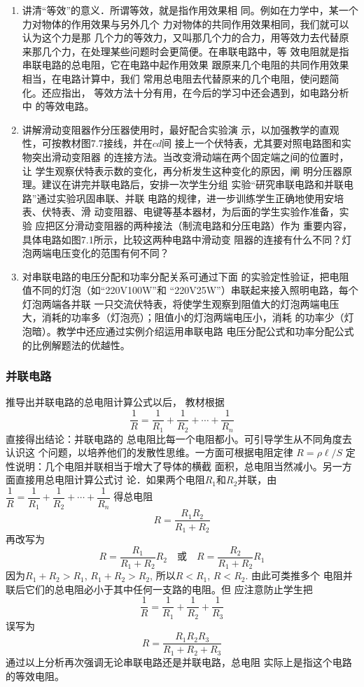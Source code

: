 \begin{enumerate}
    \item 讲清“等效”的意义．所谓等效，就是指作用效果相
同。例如在力学中，某一个力对物体的作用效果与另外几个
力对物体的共同作用效果相同，我们就可以认为这个力是那
几个力的等效力，又叫那几个力的合力，用等效力去代替原
来那几个力，在处理某些问题时会更简便。在串联电路中，等
效电阻就是指串联电路的总电阻，它在电路中起作用效果
跟原来几个电阻的共同作用效果相当，在电路计算中，我们
常用总电阻去代替原来的几个电阻，使问题简化。还应指出，
等效方法十分有用，在今后的学习中还会遇到，如电路分析中
的等效电路。
\item 讲解滑动变阻器作分压器使用时，最好配合实验演
示，以加强教学的直观性，可按教材图7.7接线，并在$cd$间
接上一个伏特表，尤其要对照电路图和实物突出滑动变阻器
的连接方法。当改变滑动端在两个固定端之间的位置时，让
学生观察伏特表示数的变化，再分析发生这种变化的原因，阐
明分压器原理。建议在讲完并联电路后，安排一次学生分组
实验“研究串联电路和并联电路”通过实验巩固串联、并联
电路的规律，进一步训练学生正确地使用安培表、伏特表、滑
动变阻器、电键等基本器材，为后面的学生实验作准备，实验
应把区分滑动变阻器的两种接法（制流电路和分压电路）作为
重要内容，具体电路如图7.1所示，比较这两种电路中滑动变
阻器的连接有什么不同？灯泡两端电压变化的范围有何不同？

\begin{figure}[htp]
    \centering
    \caption{}
\end{figure}
\item 对串联电路的电压分配和功率分配关系可通过下面
的实验定性验证，把电阻值不同的灯泡（如“220V100W”和
“220V25W”）串联起来接入照明电路，每个灯泡两端各并联
一只交流伏特表，将使学生观察到阻值大的灯泡两端电压
大，消耗的功率多（灯泡亮）；阻值小的灯泡两端电压小，消耗
的功率少（灯泡暗）。教学中还应通过实例介绍运用串联电路
电压分配公式和功率分配公式的比例解题法的优越性。
\end{enumerate}

\subsubsection{并联电路}

推导出并联电路的总电阻计算公式以后，
教材根据
\[\frac{1}{R}=\frac{1}{R_1}+\frac{1}{R_2}+\cdots+\frac{1}{R_n}\]
直接得出结论：并联电路的
总电阻比每一个电阻都小。可引导学生从不同角度去认识这
个问题，以培养他们的发散性思维。一方面可根据电阻定律
$R=\rho\ell/S$
定性说明：几个电阻并联相当于增大了导体的横截
面积，总电阻当然减小。另一方面直接用总电阻计算公式讨
论．如果两个电阻$R_1$和$R_2$并联，由
$\dfrac{1}{R}=\dfrac{1}{R_1}+\dfrac{1}{R_2}+\cdots+\dfrac{1}{R_n}$
得总电阻
\[R=\frac{R_1R_2}{R_1+R_2}\]
再改写为
\[R=\frac{R_1}{R_1+R_2}R_2\quad \text{或}\quad R=\frac{R_2}{R_1+R_2}R_1\]
因为$R_1+R_2>R_1$, $R_1+R_2>R_2$, 所以$R<R_1$, $R<R_2$. 由此可类推多个
电阻并联后它们的总电阻必小于其中任何一支路的电阻。但
应注意防止学生把
\[\frac{1}{R}=\frac{1}{R_1}+\frac{1}{R_2}+\frac{1}{R_3}\]
误写为
\[R=\frac{R_1R_2R_3}{R_1+R_2+R_3}\]
通过以上分析再次强调无论串联电路还是并联电路，总电阻
实际上是指这个电路的等效电阻。

